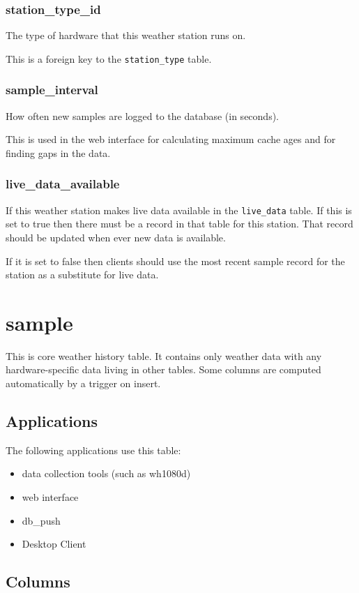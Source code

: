 \documentclass[a4paper,10pt]{book}
\begin{document}
\subsubsection{station\_type\_id}
The type of hardware that this weather station runs on.

This is a foreign key to the \verb|station_type| table.

\subsubsection{sample\_interval}
How often new samples are logged to the database (in seconds).

This is used in the web interface for calculating maximum cache ages and for finding gaps in the data.

\subsubsection{live\_data\_available}
If this weather station makes live data available in the \verb|live_data| table. If this is set to true then there must be a record in that table for this station. That record should be updated when ever new data is available.

If it is set to false then clients should use the most recent sample record for the station as a substitute for live data.

\section{sample}
This is core weather history table. It contains only weather data with any hardware-specific data living in other tables. Some columns are computed automatically by a trigger on insert.

\subsection{Applications}
The following applications use this table:
\begin{itemize}
\item data collection tools (such as wh1080d)
\item web interface
\item db\_push
\item Desktop Client
\end{itemize}

\subsection{Columns}
\end{document}
